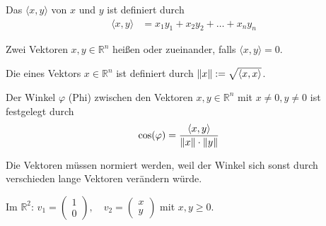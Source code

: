 Das  $\langle x, y\rangle$ von $x$ und $y$ ist definiert durch
\begin{align*}
    \langle x, y\rangle &= x_1y_1 + x_2y_2 + \dots + x_ny_n
\end{align*}

Zwei Vektoren $x, y \in \mathbb{R}^n$ heißen  oder  zueinander, falls $\langle x, y\rangle = 0$.

Die  eines Vektors $x \in \mathbb{R}^n$ ist definiert durch $\left\lVert x\right\rVert := \sqrt{\langle x, x\rangle}$.

Der Winkel $\varphi$ (Phi) zwischen den Vektoren $x, y \in \mathbb{R}^n$ mit $x\neq 0, y\neq 0$ ist festgelegt durch
\begin{align*}
    \text{cos}(\varphi) &= \frac{\langle x, y\rangle}{\left\lVert x\right\rVert\cdot\left\lVert y\right\rVert}
\end{align*}

\begin{center}
\end{center}
Die Vektoren müssen normiert werden, weil der Winkel sich sonst durch verschieden lange Vektoren verändern würde.

Im $\mathbb{R}^2$: $v_1 = \begin{pmatrix}1\\0\end{pmatrix},\quad v_2 = \begin{pmatrix}x\\y\end{pmatrix}$ mit $x, y \geq 0$.

